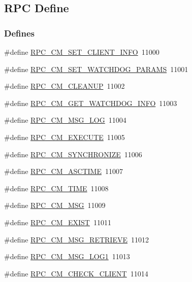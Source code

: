 \subsection{RPC Define}
\label{group__mrpcdefineh}
\subsubsection*{Defines}
\begin{DoxyCompactItemize}
\item 
\#define \hyperlink{group__mrpcdefineh_ga31120a65ddf8e807d5722fb30fcfb717}{RPC\_\-CM\_\-SET\_\-CLIENT\_\-INFO}~11000
\item 
\#define \hyperlink{group__mrpcdefineh_gacf26660c68ca2cf0717213226e9048f1}{RPC\_\-CM\_\-SET\_\-WATCHDOG\_\-PARAMS}~11001
\item 
\#define \hyperlink{group__mrpcdefineh_gaeddbbd744c03a8990102d06e4b525d4c}{RPC\_\-CM\_\-CLEANUP}~11002
\item 
\#define \hyperlink{group__mrpcdefineh_gaf64b3d2c73048e4ca07a5aa8bb70c326}{RPC\_\-CM\_\-GET\_\-WATCHDOG\_\-INFO}~11003
\item 
\#define \hyperlink{group__mrpcdefineh_gacf43c40575a236cae5e83a9380f964e7}{RPC\_\-CM\_\-MSG\_\-LOG}~11004
\item 
\#define \hyperlink{group__mrpcdefineh_gae75588700fd5b48de1640563e74ae4c5}{RPC\_\-CM\_\-EXECUTE}~11005
\item 
\#define \hyperlink{group__mrpcdefineh_ga24e35d6645a1fc940b10523bc4061b23}{RPC\_\-CM\_\-SYNCHRONIZE}~11006
\item 
\#define \hyperlink{group__mrpcdefineh_ga1a312b4bf66e355c7508e611485b65e0}{RPC\_\-CM\_\-ASCTIME}~11007
\item 
\#define \hyperlink{group__mrpcdefineh_ga087c4a9e16ed585101f90c1417ce3e8e}{RPC\_\-CM\_\-TIME}~11008
\item 
\#define \hyperlink{group__mrpcdefineh_ga61050d4425a71753c645d94cb280d7f6}{RPC\_\-CM\_\-MSG}~11009
\item 
\#define \hyperlink{group__mrpcdefineh_ga0d45be0755215931e2d4aceb91df38cf}{RPC\_\-CM\_\-EXIST}~11011
\item 
\#define \hyperlink{group__mrpcdefineh_gada6c0b63689032378b7ef710ec5793c2}{RPC\_\-CM\_\-MSG\_\-RETRIEVE}~11012
\item 
\#define \hyperlink{group__mrpcdefineh_gad4f6e60f24b227405abd4e5394693092}{RPC\_\-CM\_\-MSG\_\-LOG1}~11013
\item 
\#define \hyperlink{group__mrpcdefineh_ga15efc37e61154a6f4f4e52e852b8d858}{RPC\_\-CM\_\-CHECK\_\-CLIENT}~11014

\end{DoxyCompactItemize}
